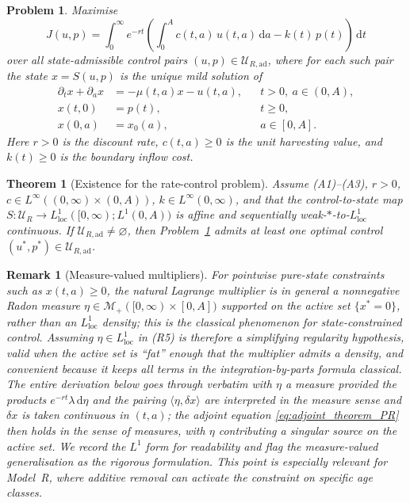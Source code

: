 \documentclass[10pt,a4paper]{amsart}
\newtheorem{problem}{Problem}
\newtheorem{theorem}{Theorem}
\newtheorem{remark}{Remark}
\newcommand{\dd}{\,\mathrm{d}}
\begin{document}
\begin{problem}\label{prob:PR}
Maximise
\begin{equation}\label{eq:PR_obj}
J(u,p)=\int_0^\infty e^{-rt}
\left(\int_0^A c(t,a)\,u(t,a)\dd a-k(t)\,p(t)\right)\dd t
\end{equation}
over all state-admissible control pairs $(u,p)\in\mathcal{U}_{R,\mathrm{ad}}$,
where for each such pair the state $x=S(u,p)$ is the unique mild solution of
\begin{align}
\partial_t x+\partial_a x&=-\mu(t,a)x-u(t,a), && t>0,\ a\in(0,A),
\label{eq:PR_state}\\
x(t,0)&=p(t), && t\ge0, \label{eq:PR_bc}\\
x(0,a)&=x_0(a), && a\in[0,A]. \label{eq:PR_ic}
\end{align}
Here $r>0$ is the discount rate, $c(t,a)\ge0$ is the unit harvesting value,
and $k(t)\ge0$ is the boundary inflow cost.
\end{problem}

\begin{theorem}[Existence for the rate-control problem]
\label{thm:existence_PR}
Assume \textup{(A1)--(A3)}, $r>0$, $c\in L^\infty((0,\infty)\times(0,A))$,
$k\in L^\infty(0,\infty)$, and that the control-to-state map
$S:\mathcal{U}_R\to L^1_{\mathrm{loc}}([0,\infty);L^1(0,A))$ is affine and
sequentially weak-$\ast$-to-$L^1_{\mathrm{loc}}$ continuous. If
$\mathcal{U}_{R,\mathrm{ad}}\neq\varnothing$, then Problem~\ref{prob:PR}
admits at least one optimal control
$(u^\ast,p^\ast)\in\mathcal{U}_{R,\mathrm{ad}}$.
\end{theorem}

\begin{remark}[Measure-valued multipliers]
\label{rem:measure_multiplier}
For pointwise pure-state constraints such as $x(t,a)\ge0$, the natural
Lagrange multiplier is in general a nonnegative Radon measure
$\eta\in\mathcal{M}_+([0,\infty)\times[0,A])$ supported on the active set
$\{x^\ast=0\}$, rather than an $L^1_{\mathrm{loc}}$ density; this is the
classical phenomenon for state-constrained control. Assuming
$\eta\in L^1_{\mathrm{loc}}$ in (R5) is therefore a \emph{simplifying
regularity hypothesis}, valid when the active set is ``fat'' enough that the
multiplier admits a density, and convenient because it keeps all terms in
the integration-by-parts formula classical. The entire derivation below goes
through verbatim with $\eta$ a measure provided the products
$e^{-rt}\lambda\dd\eta$ and the pairing $\langle\eta,\delta x\rangle$ are
interpreted in the measure sense and $\delta x$ is taken continuous in
$(t,a)$; the adjoint equation \eqref{eq:adjoint_theorem_PR} then holds in the
sense of measures, with $\eta$ contributing a singular source on the active
set. We record the $L^1$ form for readability and flag the measure-valued
generalisation as the rigorous formulation. This point is especially
relevant for Model~R, where additive removal can activate the constraint on
specific age classes.
\end{remark}
\end{document}
